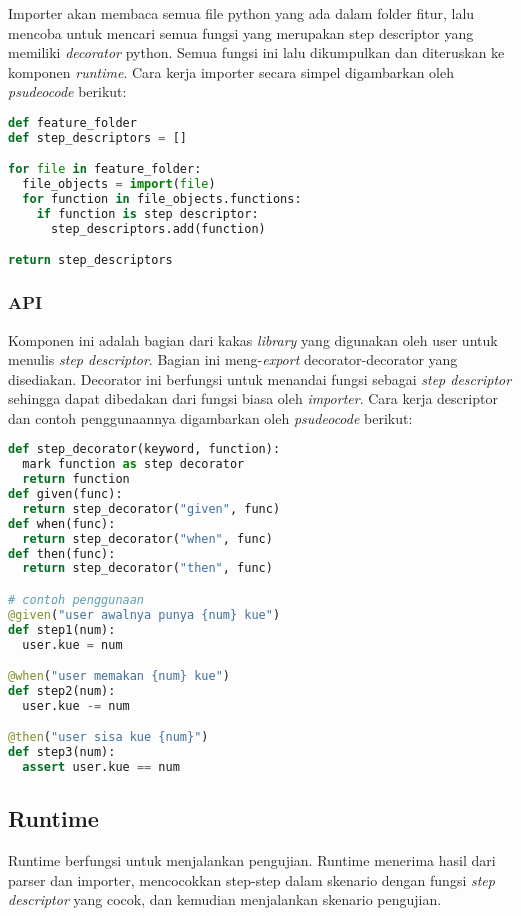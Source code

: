 Importer akan membaca semua file python yang ada dalam folder fitur, lalu mencoba untuk
mencari semua fungsi yang merupakan step descriptor yang memiliki \emph{decorator} python.
Semua fungsi ini lalu dikumpulkan dan diteruskan ke komponen \emph{runtime}.
Cara kerja importer secara simpel digambarkan oleh \emph{psudeocode} berikut:

\begin{lstlisting}[language=python]
def feature_folder
def step_descriptors = []

for file in feature_folder:
  file_objects = import(file)
  for function in file_objects.functions:
    if function is step descriptor:
      step_descriptors.add(function)

return step_descriptors
\end{lstlisting}

\subsubsection{API}

Komponen ini adalah bagian dari kakas \emph{library} yang digunakan oleh user untuk menulis
\emph{step descriptor}. Bagian ini meng-\emph{export} decorator-decorator yang disediakan.
Decorator ini berfungsi untuk menandai fungsi sebagai \emph{step descriptor} sehingga dapat
dibedakan dari fungsi biasa oleh \emph{importer}. Cara kerja descriptor dan contoh penggunaannya
digambarkan oleh \emph{psudeocode} berikut:

\begin{lstlisting}[language=python]
def step_decorator(keyword, function):
  mark function as step decorator
  return function
def given(func):
  return step_decorator("given", func)
def when(func):
  return step_decorator("when", func)
def then(func):
  return step_decorator("then", func)

# contoh penggunaan
@given("user awalnya punya {num} kue")
def step1(num):
  user.kue = num

@when("user memakan {num} kue")
def step2(num):
  user.kue -= num

@then("user sisa kue {num}")
def step3(num):
  assert user.kue == num
\end{lstlisting}


\subsection{Runtime}

Runtime berfungsi untuk menjalankan pengujian. Runtime menerima hasil dari parser dan importer,
mencocokkan step-step dalam skenario dengan fungsi \emph{step descriptor} yang cocok,
dan kemudian menjalankan skenario pengujian.


